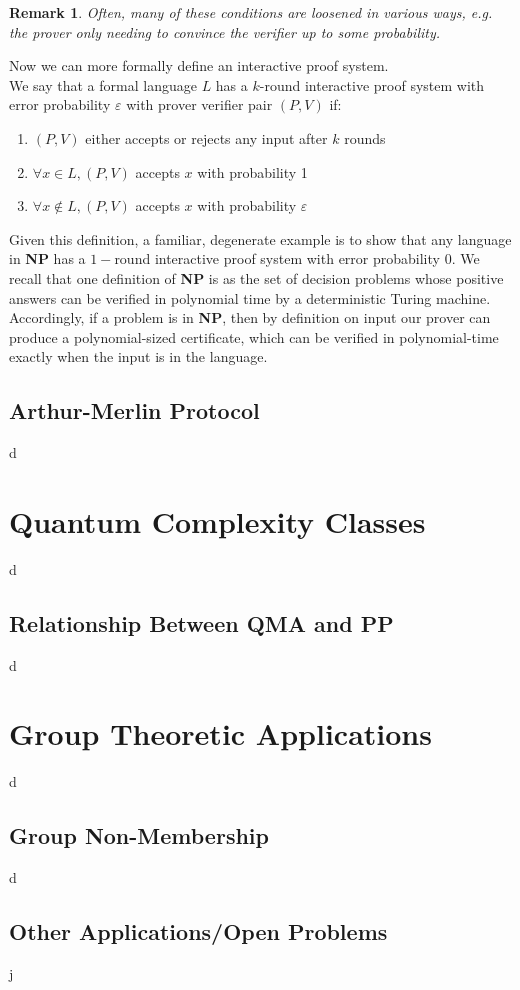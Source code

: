 \documentclass[12pt]{article}
\newtheorem*{rmk}{Remark}
\begin{document}
	\begin{rmk} Often, many of these conditions are loosened in various ways, e.g. the prover only needing to convince the verifier up to some probability.\end{rmk}
	
	Now we can more formally define an interactive proof system.\\
	
	We say that a formal language $L$ has a $k$-round interactive proof system with error probability $\varepsilon$ with prover verifier pair $(P,V)$ if:
	\begin{enumerate}
		\item $(P,V)$ either accepts or rejects any input after $k$ rounds
		\item $\forall x\in L, (P,V)$ accepts $x$ with probability 1
		\item $\forall x\notin L, (P,V)$ accepts $x$ with probability $\varepsilon$ 
	\end{enumerate}
	
	Given this definition, a familiar, degenerate example is to show that any language in \textbf{NP} has a $1-$round interactive proof system with error probability $0$. We recall that one definition of \textbf{NP} is as the set of decision problems whose positive answers can be verified in polynomial time by a deterministic Turing machine. Accordingly, if a problem is in \textbf{NP}, then by definition on input our prover can produce a polynomial-sized certificate, which can be verified in polynomial-time exactly when the input is in the language.     
	\subsection{Arthur-Merlin Protocol}
	d
    \section{Quantum Complexity Classes}
    d
    \subsection{Relationship Between QMA and PP}d
    
    \section{Group Theoretic Applications}
    d
    \subsection{Group Non-Membership}d
    \subsection{Other Applications/Open Problems}j
	
	
	
		
\end{document}
